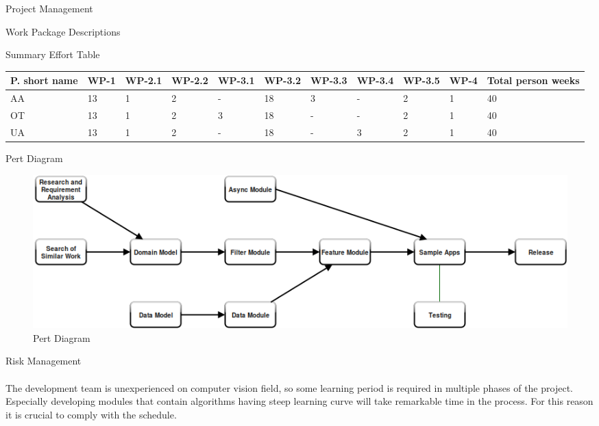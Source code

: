 \documentclass[12pt, a4paper]{article} \pagenumbering{gobble}
\begin{document}
\begin{section}{Project Management}
\begin{subsubsection}{Work Package Descriptions}
\end{subsubsection}
\newpage
\begin{subsubsection}{Summary Effort Table}
  \begin{tabularx}{\textwidth}{|*{11}{Y|}}
   \hline
   \textbf{P. short name} & \textbf{WP-1} & \textbf{WP-2.1} & \textbf{WP-2.2} & \textbf{WP-3.1} & \textbf{WP-3.2} & \textbf{WP-3.3} & \textbf{WP-3.4} & \textbf{WP-3.5} & \textbf{WP-4} & \textbf{Total person weeks} \\
   \hline
   AA & 13 & 1 & 2 & - & 18 & 3 &  - & 2 & 1 & 40 \\
   \hline
   OT & 13 & 1 & 2 & 3 & 18 & - &  - & 2 & 1 & 40\\
   \hline
   UA & 13 & 1 & 2 & - & 18 & - &  3 & 2 & 1 & 40\\
  \hline
 \end{tabularx}
\end{subsubsection}
\newpage
\begin{landscape}
\begin{subsection}{Pert Diagram}
  \newline
  \vspace{1cm}
  \newline
  \begin{figure}[h]
    \centering
    \includegraphics[scale=0.80]{pert.png}
    \newline
    \caption{Pert Diagram}
  \end{figure}
\end{subsection}
\end{landscape}
\newpage
\begin{subsection}{Risk Management}
  \paragraph{}{%
  The development team is unexperienced on computer vision field, so some learning
  period is required in multiple phases of the project. Especially developing modules that contain algorithms
  having steep learning curve will take remarkable time in the process. For this reason it is crucial to comply with
  the schedule.\\
  }
\end{subsection}
\end{section}
\end{document}
